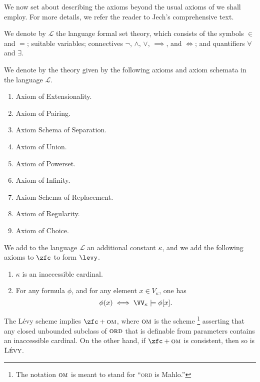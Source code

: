 We now set about describing the axioms beyond the usual axioms of \zfc we shall employ.
For more details, we refer the reader to Jech's comprehensive text.\cite{Jech:2003tt}

\begin{notation}%
\label{ntn:ZFC}
	We denote by $\mathscr{L}$ the language formal set theory,
	which consists of the symbols $\in$ and $=$; suitable variables; connectives $\neg$, $\wedge$, $\vee$, $\implies$, and $\iff$; and quantifiers $\forall$ and $\exists$.

	We denote by \zfc the theory given by the following axioms and axiom schemata in the language $\mathscr{L}$.
	\begin{enumerate}
		\item Axiom of Extensionality.\cite[p. 4]{Jech:2003tt}
		\item Axiom of Pairing.\cite[p. 6]{Jech:2003tt}
		\item Axiom Schema of Separation.\cite[p. 7]{Jech:2003tt}
		\item Axiom of Union.\cite[p. 9]{Jech:2003tt}
		\item Axiom of Powerset.\cite[p. 9]{Jech:2003tt}
		\item Axiom of Infinity.\cite[p. 12]{Jech:2003tt}
		\item Axiom Schema of Replacement.\cite[p. 13]{Jech:2003tt}
		\item Axiom of Regularity.\cite[p. 63]{Jech:2003tt}
		\item Axiom of Choice.\cite[p. 47]{Jech:2003tt}
	\end{enumerate}
\end{notation}


\begin{axiom}%
\label{axm:Levy}
	We add to the language $\mathscr{L}$ an additional constant $\kappa$,
	and we add the following axioms to $\zfc$ to form  $\levy$.
	\begin{enumerate}
		\item $\kappa$ is an inaccessible cardinal.
		\item {} For any formula $\phi$, and for any element $x\in V_{\kappa}$, one has
		\[
			\phi(x)\iff \VV_{\kappa}\models\phi[x].
		\]
	\end{enumerate}
\end{axiom}

The Lévy scheme implies $\zfc+\textsc{om}$, where $\textsc{om}$ is the scheme%
\footnote{The notation $\textsc{om}$ is meant to stand for \enquote{\textsc{ord} is Mahlo.}}
asserting that any closed unbounded subclass of $\textsc{ord}$ that is definable from parameters contains an inaccessible cardinal.
On the other hand, if $\zfc+\textsc{om}$ is consistent, then so is $\textsc{Lévy}$.

